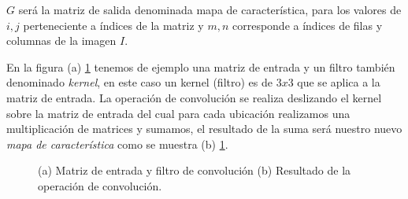 $G$ será la matriz de salida denominada mapa de característica, para los valores de $i, j$ perteneciente a índices  de la matriz y $m, n$ corresponde a índices de filas y columnas de la imagen $I$.



En la figura (a) \ref{Fig:filter} tenemos de ejemplo una matriz de entrada y un filtro también denominado \textit{kernel}, en este caso un kernel (filtro) es de $3x3$ que se aplica a la matriz de entrada. La operación de convolución se realiza deslizando el kernel sobre la matriz de entrada del cual para cada ubicación realizamos una multiplicación de matrices y sumamos, el resultado de la suma será nuestro nuevo \textit{mapa de característica} como se muestra (b) \ref{Fig:filter}.

\begin{figure}[htbp]
\centering
{}%

\caption{(a) Matriz de entrada y filtro de convolución (b) Resultado de la operación de convolución.}\label{Fig:filter}
\end{figure}


